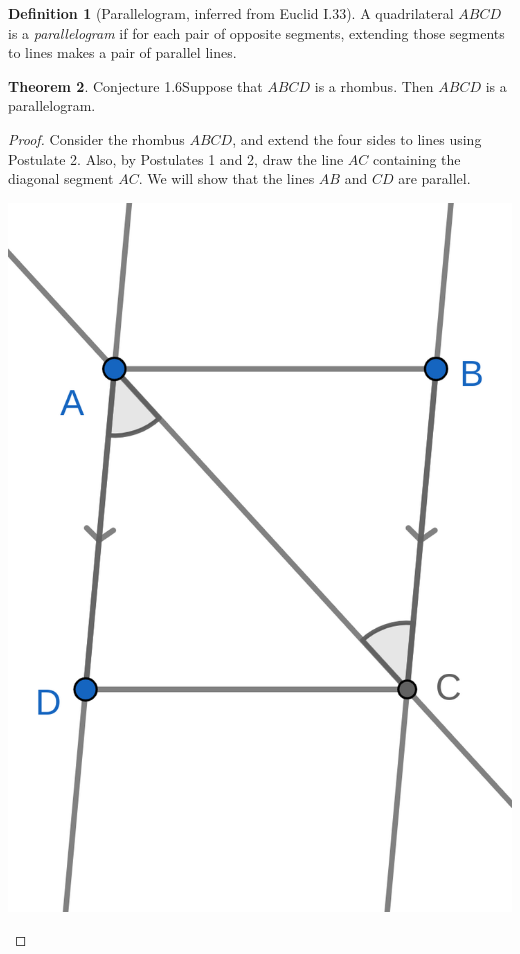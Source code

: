 \documentclass{tufte-handout}
\theoremstyle{definition}
\newtheorem{theorem}{Theorem}[section]
\newtheorem{definition}[theorem]{Definition}
\begin{document}
\begin{definition}[Parallelogram, inferred from Euclid I.33] \label{definition:parallelogram}
A quadrilateral $ABCD$ is a \emph{parallelogram} if for each pair of opposite segments, extending those segments to lines makes a pair of parallel lines.
\end{definition}


\begin{theorem}{Conjecture 1.6}\label{theorem:rhombus-parallelogram}
Suppose that $ABCD$ is a rhombus. Then $ABCD$ is a parallelogram.
\end{theorem}

\begin{proof}
Consider the rhombus $ABCD$, and extend the four sides to lines using Postulate 2. Also, by Postulates 1 and 2, draw the line $AC$ containing the diagonal segment $AC$. We will show that the lines $AB$ and $CD$ are parallel.

\begin{marginfigure}
  \includegraphics{images/rhombus_parallel_sides.png}
\end{marginfigure}


\end{proof}
\end{document}
